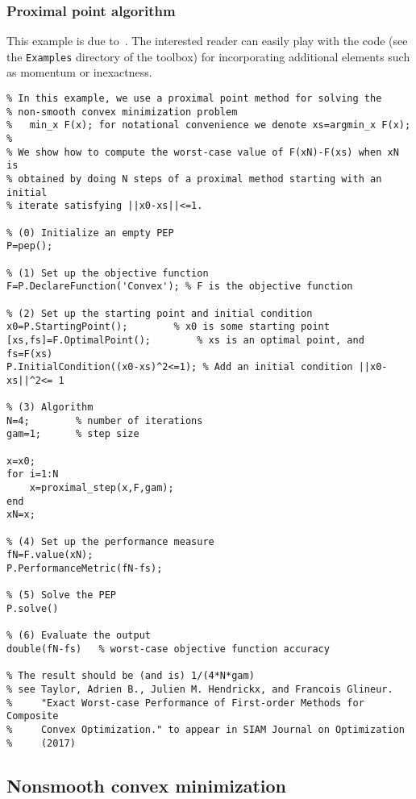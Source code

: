 \documentclass[11pt,a4paper]{article}
\begin{document}
\subsubsection{Proximal point algorithm}
This example is due to~\cite{taylor2015exact}. The interested reader can easily play with the code (see the \verb?Examples? directory of the toolbox) for incorporating additional elements such as momentum or inexactness.
\begin{lstlisting}
% In this example, we use a proximal point method for solving the 
% non-smooth convex minimization problem
%   min_x F(x); for notational convenience we denote xs=argmin_x F(x);
%
% We show how to compute the worst-case value of F(xN)-F(xs) when xN is
% obtained by doing N steps of a proximal method starting with an initial
% iterate satisfying ||x0-xs||<=1.

% (0) Initialize an empty PEP
P=pep();

% (1) Set up the objective function
F=P.DeclareFunction('Convex'); % F is the objective function

% (2) Set up the starting point and initial condition
x0=P.StartingPoint();		 % x0 is some starting point
[xs,fs]=F.OptimalPoint(); 		 % xs is an optimal point, and fs=F(xs)
P.InitialCondition((x0-xs)^2<=1); % Add an initial condition ||x0-xs||^2<= 1

% (3) Algorithm
N=4;		% number of iterations
gam=1;		% step size

x=x0;
for i=1:N
	x=proximal_step(x,F,gam);
end
xN=x;

% (4) Set up the performance measure
fN=F.value(xN);
P.PerformanceMetric(fN-fs);

% (5) Solve the PEP
P.solve()

% (6) Evaluate the output
double(fN-fs)   % worst-case objective function accuracy

% The result should be (and is) 1/(4*N*gam)
% see Taylor, Adrien B., Julien M. Hendrickx, and Francois Glineur.
%     "Exact Worst-case Performance of First-order Methods for Composite
%     Convex Optimization." to appear in SIAM Journal on Optimization
%     (2017)
\end{lstlisting}
\newpage
\subsection{Nonsmooth convex minimization}
\end{document}
